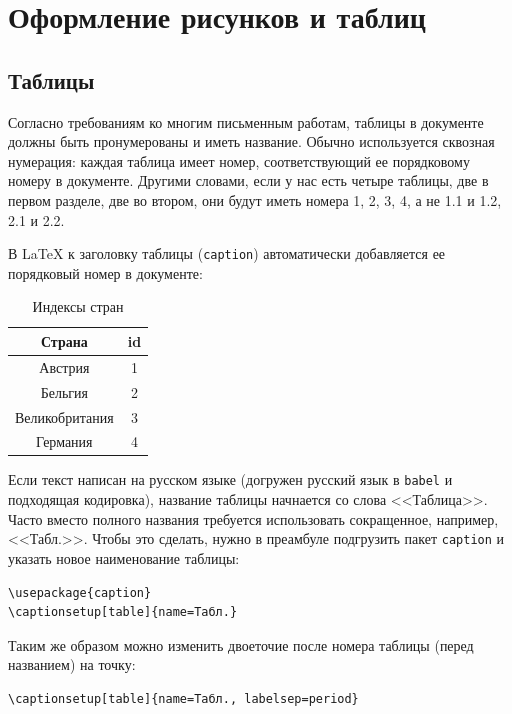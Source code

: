 \documentclass[12pt]{article}
\begin{document}
\section{Оформление рисунков и таблиц}

\subsection{Таблицы}

Согласно требованиям ко многим письменным работам, таблицы в документе должны быть пронумерованы и иметь название. Обычно используется сквозная нумерация: каждая таблица имеет номер, соответствующий ее порядковому номеру в документе. Другими словами, если у нас есть четыре таблицы, две в первом разделе, две во втором, они будут иметь номера 1, 2, 3, 4, а не 1.1 и 1.2, 2.1 и 2.2. 

В \LaTeX{} к заголовку таблицы (\texttt{caption}) автоматически добавляется ее порядковый номер в документе:

\begin{table}[ht!]
\centering
\caption{Индексы стран}
\begin{tabular}{|c|c|}
\hline
Страна & id \\
\hline
Австрия & 1 \\
Бельгия & 2 \\
Великобритания & 3 \\
Германия & 4 \\
\hline
\end{tabular}
\end{table}

Если текст написан на русском языке (догружен русский язык в \texttt{babel} и подходящая кодировка), название таблицы начнается со слова <<Таблица>>. Часто вместо полного названия требуется использовать сокращенное, например, <<Табл.>>. Чтобы это сделать, нужно в преамбуле подгрузить пакет \texttt{caption} и указать новое наименование таблицы:

\begin{center}
\begin{BVerbatim}
\usepackage{caption}
\captionsetup[table]{name=Табл.} 
\end{BVerbatim} 
\end{center}

Таким же образом можно изменить двоеточие после номера таблицы (перед названием) на точку:

\begin{center}
\begin{BVerbatim}
\captionsetup[table]{name=Табл., labelsep=period} 
\end{BVerbatim} 
\end{center}
\end{document}
